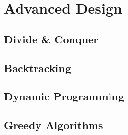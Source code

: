 \documentclass[
../../AuD-Zusammenfassung.tex,
]
{subfiles}
\begin{document}
\section{Advanced Design}
\subsection{Divide \& Conquer}


\newpage
\subsection{Backtracking}


\newpage
\subsection{Dynamic Programming}


\newpage
\subsection{Greedy Algorithms}
\end{document}
